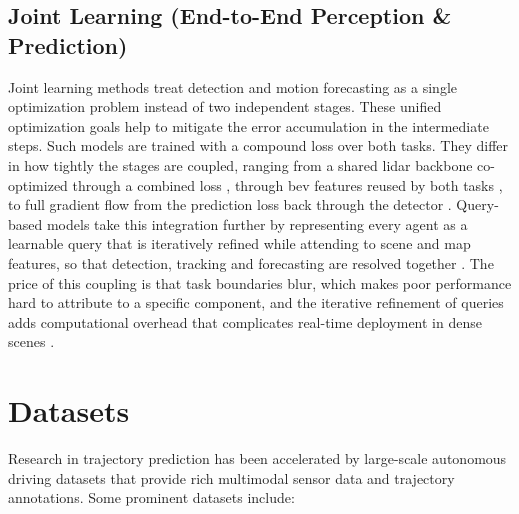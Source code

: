 \subsection{Joint Learning (End-to-End Perception \& Prediction)}
\label{subsec:sota-e2e}
Joint learning methods treat detection and motion forecasting as a single optimization problem instead of two independent stages.
These unified optimization goals help to mitigate the error accumulation in the intermediate steps.
Such models are trained with a compound loss over both tasks. They differ in how tightly the stages are coupled,
ranging from a shared \ac{lidar} backbone co-optimized through
a combined loss \cite{Luo2018FaF}, through \ac{bev} features reused by both tasks \cite{Hu2021FIERY}, to full
gradient flow from the prediction loss back through the detector \cite{Liang2020PnPNet}. Query-based models
take this integration further by representing every agent as a learnable query that is iteratively refined
while attending to scene and map features, so that detection, tracking and forecasting are resolved together
\cite{Gu2023ViP3D,Casas2024DeTra}.
The price of this coupling is that task boundaries blur, which makes poor performance hard to attribute to a
specific component, and the iterative refinement of queries adds computational overhead that complicates
real-time deployment in dense scenes \cite{madjid2025survey}.




\section{Datasets}
\label{sec:sota-datasets}

\quad Research in trajectory prediction has been accelerated by large-scale autonomous driving datasets that provide rich multimodal sensor data and trajectory annotations. Some prominent datasets include:

